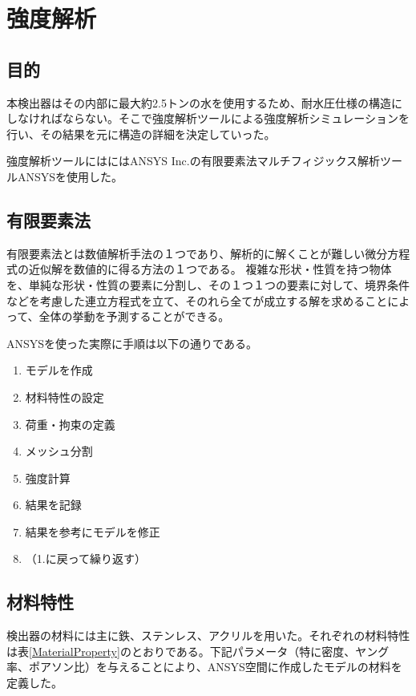 \documentclass[11pt]{ltjsreport}
\newcommand{\tabref}[1]{表\ref{#1}}
\begin{document}
\newpage
\section{強度解析}
\subsection{目的}
本検出器はその内部に最大約2.5トンの水を使用するため、耐水圧仕様の構造にしなければならない。そこで強度解析ツールによる強度解析シミュレーションを行い、その結果を元に構造の詳細を決定していった。

強度解析ツールにはにはANSYS Inc.の有限要素法マルチフィジックス解析ツールANSYSを使用した。

\subsection{有限要素法}
有限要素法とは数値解析手法の１つであり、解析的に解くことが難しい微分方程式の近似解を数値的に得る方法の１つである。
複雑な形状・性質を持つ物体を、単純な形状・性質の要素に分割し、その１つ１つの要素に対して、境界条件などを考慮した連立方程式を立て、そのれら全てが成立する解を求めることによって、全体の挙動を予測することができる。


ANSYSを使った実際に手順は以下の通りである。

\begin{enumerate}
\item モデルを作成
\item 材料特性の設定
\item 荷重・拘束の定義
\item メッシュ分割
\item 強度計算
\item 結果を記録
\item 結果を参考にモデルを修正
\item （1.に戻って繰り返す）
\end{enumerate}

\subsection{材料特性}
検出器の材料には主に鉄、ステンレス、アクリルを用いた。それぞれの材料特性は\tabref{MaterialProperty}のとおりである。下記パラメータ（特に密度、ヤング率、ポアソン比）を与えることにより、ANSYS空間に作成したモデルの材料を定義した。
\end{document}
